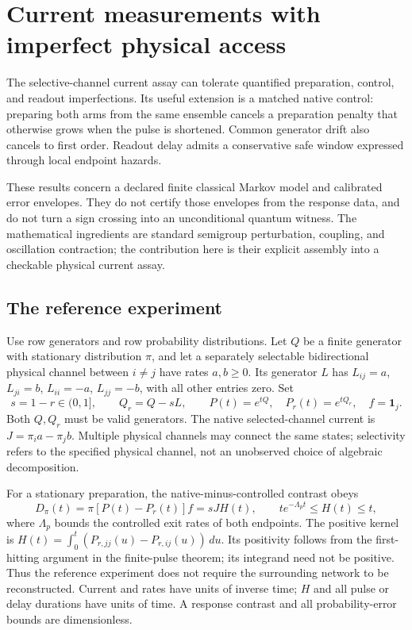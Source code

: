 \chapter{Current measurements with imperfect physical access}
\label{robustphysics:chapter}

The selective-channel current assay can tolerate quantified preparation,
control, and readout imperfections. Its useful extension is a matched native
control: preparing both arms from the same ensemble cancels a preparation
penalty that otherwise grows when the pulse is shortened. Common generator
drift also cancels to first order. Readout delay admits a conservative safe
window expressed through local endpoint hazards.

These results concern a declared finite classical Markov model and calibrated
error envelopes. They do not certify those envelopes from the response data,
and do not turn a sign crossing into an unconditional quantum witness. The
mathematical ingredients are standard semigroup perturbation, coupling, and
oscillation contraction; the contribution here is their explicit assembly into
a checkable physical current assay.

\section{The reference experiment}

Use row generators and row probability distributions. Let $Q$ be a finite
generator with stationary distribution $\pi$, and let a separately selectable
bidirectional physical channel between $i\ne j$ have rates $a,b\ge0$.
Its generator $L$ has $L_{ij}=a$, $L_{ji}=b$, $L_{ii}=-a$, $L_{jj}=-b$,
with all other entries zero. Set
\[
 s=1-r\in(0,1],\qquad Q_r=Q-sL,\qquad
 P(t)=e^{tQ},\quad P_r(t)=e^{tQ_r},\quad f=\mathbf1_j.
\]
Both $Q,Q_r$ must be valid generators. The native selected-channel current is
$J=\pi_i a-\pi_j b$. Multiple physical channels may connect the same states;
selectivity refers to the specified physical channel, not an unobserved choice
of algebraic decomposition.

For a stationary preparation, the native-minus-controlled contrast obeys
\begin{equation}\label{robustphysics:ideal}
 D_\pi(t)=\pi[P(t)-P_r(t)]f=sJH(t),\qquad
 t e^{-\Lambda_p t}\le H(t)\le t,
\end{equation}
where $\Lambda_p$ bounds the controlled exit rates of both endpoints. The
positive kernel is
$H(t)=\int_0^t(P_{r,jj}(u)-P_{r,ij}(u))\,du$. Its positivity follows from
the first-hitting argument in the finite-pulse theorem; its integrand need not
be positive. Thus the reference experiment does not require the surrounding
network to be reconstructed. Current and rates have units of inverse time;
$H$ and all pulse or delay durations have units of time. A response contrast
and all probability-error bounds are dimensionless.

